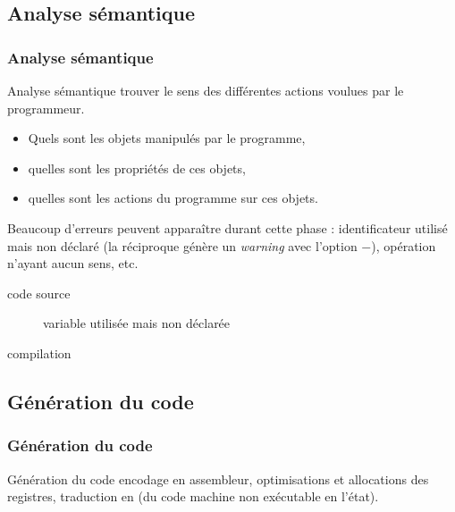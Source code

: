 \documentclass[xcolor=pdftex,svgnames,table]{beamer}
\begin{document}
\subsection{Analyse sémantique}
\begin{frame}
\frametitle{Analyse sémantique}
\begin{block}{Analyse sémantique\youwrite}
  trouver le sens des différentes actions
  voulues par le programmeur.
  \begin{itemize}
  \item Quels sont les objets manipulés par le programme,
  \item quelles sont les propriétés de ces objets,
  \item quelles sont les actions du programme sur ces objets.
  \end{itemize}

\end{block}
\pause
Beaucoup d'erreurs peuvent apparaître durant cette phase : identificateur utilisé mais non
déclaré (la réciproque génère un \emph{warning} avec l'option $-$), opération n'ayant
aucun sens, etc.


\begin{description}
\item[code source] variable  utilisée mais non déclarée
\item[compilation] 
\end{description}
\end{frame}


\subsection{Génération du code}
\begin{frame}
\frametitle{Génération du code}
\begin{block}{Génération du code\youwrite}
  encodage en assembleur, optimisations et allocations des registres,
  traduction en  (du code machine non exécutable
  en l'état).
\end{block}
\end{frame}
\end{document}
